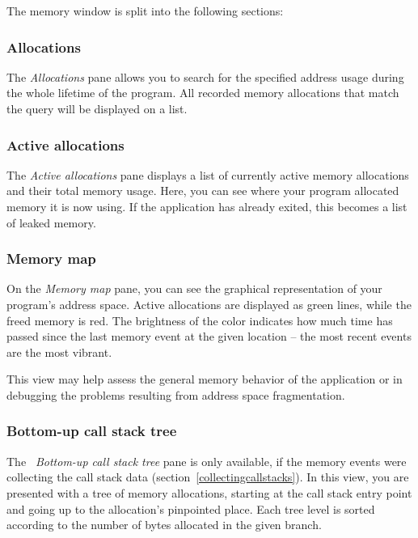 \documentclass[hidelinks,titlepage,a4paper]{article}
\begin{document}
The memory window is split into the following sections:

\subsubsection{Allocations}

The \emph{\faAt{} Allocations} pane allows you to search for the specified address usage during the whole lifetime of the program. All recorded memory allocations that match the query will be displayed on a list.

\subsubsection{Active allocations}

The \emph{\faHeartbeat{} Active allocations} pane displays a list of currently active memory allocations and their total memory usage. Here, you can see where your program allocated memory it is now using. If the application has already exited, this becomes a list of leaked memory.

\subsubsection{Memory map}

On the \emph{\faMap{} Memory map} pane, you can see the graphical representation of your program's address space. Active allocations are displayed as green lines, while the freed memory is red. The brightness of the color indicates how much time has passed since the last memory event at the given location -- the most recent events are the most vibrant.

This view may help assess the general memory behavior of the application or in debugging the problems resulting from address space fragmentation.

\subsubsection{Bottom-up call stack tree}
\label{callstacktree}

The \emph{\faTree{}~Bottom-up call stack tree} pane is only available, if the memory events were collecting the call stack data (section~\ref{collectingcallstacks}). In this view, you are presented with a tree of memory allocations, starting at the call stack entry point and going up to the allocation's pinpointed place. Each tree level is sorted according to the number of bytes allocated in the given branch.
\end{document}
